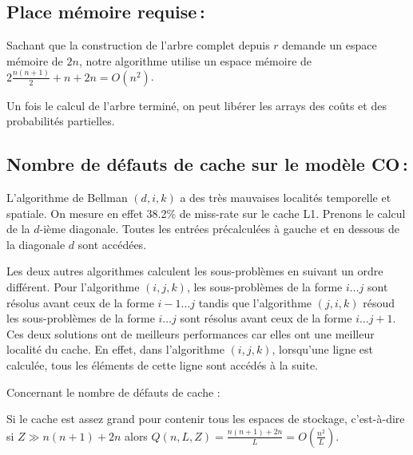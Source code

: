 \documentclass[a4paper, 10pt, french]{article}
\begin{document}
\subsection{Place mémoire requise\,: }
Sachant que la construction de l'arbre complet depuis $r$ demande un espace mémoire de $2n$, notre algorithme utilise un espace mémoire de $2\frac{n(n+1)}{2} + n + 2n = O(n^2)$. \par\leavevmode\par

Un fois le calcul de l'arbre terminé, on peut libérer les arrays des coûts et des probabilités partielles.

\subsection{Nombre de défauts de cache sur le modèle CO\,: }

L'algorithme de Bellman $(d, i, k)$ a des très mauvaises localités temporelle et spatiale. On mesure en effet 38.2\% de miss-rate sur le cache L1. Prenons le calcul de la $d$-ième diagonale. Toutes les entrées précalculées à gauche et en dessous de la diagonale $d$ sont accédées.

Les deux autres algorithmes calculent les sous-problèmes en suivant un ordre différent. Pour l'algorithme $(i, j, k)$, les sous-problèmes de la forme $i \ldots j$ sont résolus avant ceux de la forme $i - 1 \ldots j$ tandis que l'algorithme $(j, i, k)$ résoud les sous-problèmes de la forme $i \ldots j$ sont résolus avant ceux de la forme $i \ldots j + 1$. Ces deux solutions ont de meilleurs performances car elles ont une meilleur localité du cache. En effet, dans l'algorithme $(i, j, k)$, lorsqu'une ligne est calculée, tous les éléments de cette ligne sont accédés à la suite.


Concernant le nombre de défauts de cache :

Si le cache est assez grand pour contenir tous les espaces de stockage, c'est-à-dire si $Z \gg n(n+1) + 2n$ alors $Q(n, L, Z) = \frac{n(n+1) + 2n}{L} = O(\frac{n^2}{L})$.
\end{document}
